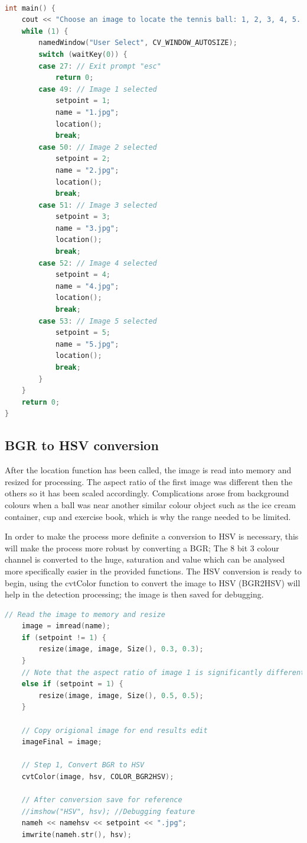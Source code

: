 \documentclass[a4paper, 10pt]{article}
\begin{document}
\
\begin{lstlisting}[language = C++]
int main() {
	cout << "Choose an image to locate the tennis ball: 1, 2, 3, 4, 5...\n\npress esc to quit\n\n-------------------------------------------------------------------------\n" << endl;
	while (1) {
		namedWindow("User Select", CV_WINDOW_AUTOSIZE);
		switch (waitKey(0)) {
		case 27: // Exit prompt "esc"
			return 0;
		case 49: // Image 1 selected
			setpoint = 1;
			name = "1.jpg";
			location();
			break;
		case 50: // Image 2 selected
			setpoint = 2;
			name = "2.jpg";
			location();
			break;
		case 51: // Image 3 selected
			setpoint = 3;
			name = "3.jpg";
			location();
			break;
		case 52: // Image 4 selected
			setpoint = 4;
			name = "4.jpg";
			location();
			break;
		case 53: // Image 5 selected
			setpoint = 5;
			name = "5.jpg";
			location();
			break;
		}
	}
	return 0;
}
\end{lstlisting}

\clearpage
\subsection{BGR to HSV conversion}

After the location function has been called, the image is read into memory and resized for processing. The aspect ratio of the first image was different then the others so it has been scaled accordingly. Complications arose from background colours when a ball was near another similar colour object such as the ice cream container, cup and exercise book, which is why the range needed to be limited.

In order to make the process more definite a conversion to HSV is necessary, this will make the process more robust by converting a BGR; The 8 bit 3 colour channel is converted to the huge, saturation and value which can be analysed more specifically easier in the provided functions. The HSV conversion is ready to begin, using the cvtColor function to convert the image to HSV (BGR2HSV) will help in the detection processing; the image is then saved for debugging.

\begin{lstlisting}[language = C++]
	// Read the image to memory and resize
	image = imread(name);
	if (setpoint != 1) {
		resize(image, image, Size(), 0.3, 0.3);
	}
	// Note that the aspect ratio of image 1 is significantly different than the others, these values provide better results
	else if (setpoint = 1) {
		resize(image, image, Size(), 0.5, 0.5);
	}

	// Copy origional image for end results edit
	imageFinal = image;

	// Step 1, Convert BGR to HSV
	cvtColor(image, hsv, COLOR_BGR2HSV);

	// After conversion save for reference
	//imshow("HSV", hsv); //Debugging feature
	nameh << namehsv << setpoint << ".jpg";
	imwrite(nameh.str(), hsv);
\end{lstlisting}
\end{document}
